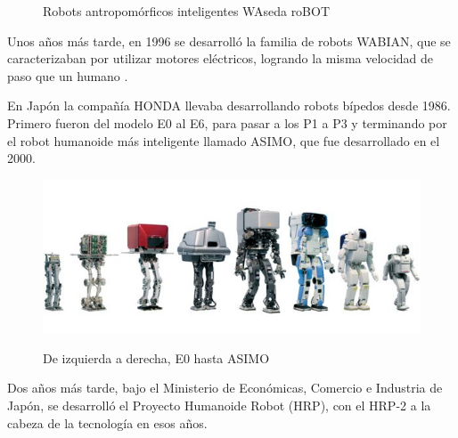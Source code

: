 \begin{figure}[H]
\caption{Robots antropomórficos inteligentes WAseda roBOT}
\label{figura211}
\end{figure}

Unos años más tarde, en 1996 se desarrolló la familia de robots WABIAN, que se caracterizaban por utilizar motores eléctricos, logrando la misma velocidad de paso que un humano \cite{ref8}.

En Japón la compañía HONDA llevaba desarrollando robots bípedos desde 1986. Primero fueron del modelo E0 al E6, para pasar a los P1 a P3 y terminando por el robot humanoide más inteligente llamado ASIMO, que fue desarrollado en el 2000.

\begin{figure}[H]
\centering
{\includegraphics[scale=0.7]{imagenes/apartado_2/212_evolucion_Honda_robots}}
\caption{De izquierda a derecha, E0 hasta ASIMO}
\label{figura212}
\end{figure}

Dos años más tarde, bajo el Ministerio de Económicas, Comercio e Industria de Japón, se desarrolló el Proyecto Humanoide Robot (HRP), con el HRP-2 a la cabeza de la tecnología en esos años.

